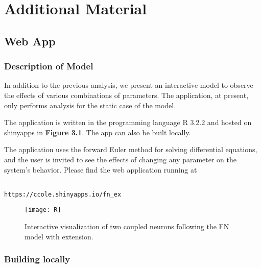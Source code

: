 \documentclass[11pt]{report}
\begin{document}


\chapter{Additional Material} %
\label{sub:web_app}


\section{Web App} %
\label{sec:web_app}



\subsection{Description of Model} %
\label{sub:description_of_model}

In addition to the previous analysis, we present an interactive model to observe the effects of various combinations of parameters. The application, at present, only performs analysis for the static case of the model.

The application is written in the programming language R 3.2.2 and hosted on shinyapps in \textbf{Figure 3.1}. The app can also be built locally. 

The application uses the forward Euler method for solving differential equations, and the user is invited to see the effects of changing any parameter on the system's behavior. Please find the web application running at 

\begin{lstlisting}
  
https://ccole.shinyapps.io/fn_ex

\end{lstlisting}




\begin{figure}[!ht]
  \caption{Interactive visualization of two coupled neurons following the FN model with extension. }
  \centering
    \texttt{[image: R]}
\end{figure}

\newpage

\subsection{Building locally} %
\label{sub:building_locally}
\end{document}
